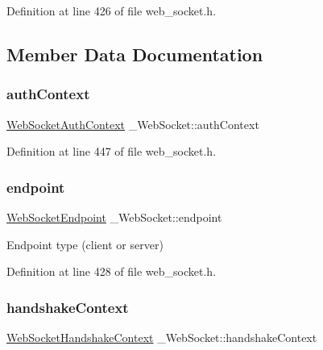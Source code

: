Definition at line 426 of file web\+\_\+socket.\+h.



\subsection{Member Data Documentation}
\mbox{\label{struct__WebSocket_acf5481349abb88e08d8dca45217e77a4}} 
\subsubsection{\texorpdfstring{auth\+Context}{authContext}}
{\footnotesize\ttfamily \hyperlink{structWebSocketAuthContext}{Web\+Socket\+Auth\+Context} \+\_\+\+Web\+Socket\+::auth\+Context}



Definition at line 447 of file web\+\_\+socket.\+h.

\mbox{\label{struct__WebSocket_af7727957641cc1977418f2de501c92cf}} 
\subsubsection{\texorpdfstring{endpoint}{endpoint}}
{\footnotesize\ttfamily \hyperlink{web__socket_8h_ae7d51561abe243c4f263d6c7d50699a9}{Web\+Socket\+Endpoint} \+\_\+\+Web\+Socket\+::endpoint}



Endpoint type (client or server) 



Definition at line 428 of file web\+\_\+socket.\+h.

\mbox{\label{struct__WebSocket_afc4fa8b72b13673ce70cf3e5e403206d}} 
\subsubsection{\texorpdfstring{handshake\+Context}{handshakeContext}}
{\footnotesize\ttfamily \hyperlink{structWebSocketHandshakeContext}{Web\+Socket\+Handshake\+Context} \+\_\+\+Web\+Socket\+::handshake\+Context}



